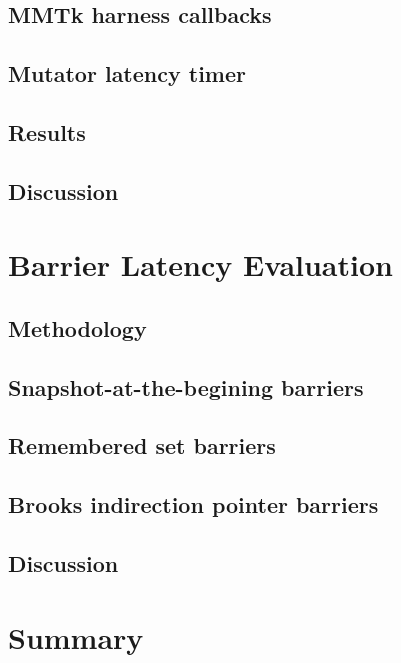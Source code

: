 \subsection{MMTk harness callbacks}
\subsection{Mutator latency timer}
\subsection{Results}
\subsection{Discussion}


\section{Barrier Latency Evaluation} %
\label{sec:barrierlatencyevaluation}
\subsection{Methodology}
\subsection{Snapshot-at-the-begining barriers}
\subsection{Remembered set barriers}
\subsection{Brooks indirection pointer barriers}
\subsection{Discussion}

\section{Summary} %
\label{sec:summary}




